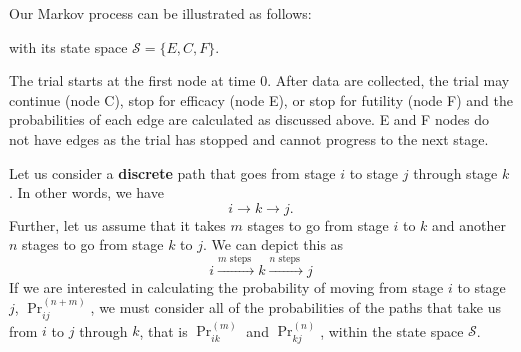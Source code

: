 \documentclass{article}
\begin{document}
Our Markov process can be illustrated as follows:
\vspace{2mm}
\begin{center}
\end{center}
%
with its state space $\mathcal{S}=\{E, C,F\}$.

The trial starts at the first node at time 0. After data are collected, the trial may continue (node C), stop for efficacy (node E), or stop for futility (node F) and the probabilities of each edge are calculated as discussed above. E and F nodes do not have edges as the trial has stopped and cannot progress to the next stage.

Let us consider a \textbf{discrete} path that goes from stage $i$ to stage $j$ through stage $k$. In other words, we have
%
\[i\to k \to  j.\]
%
Further, let us assume that it takes $m$ stages to go from stage $i$ to $k$ and another $n$ stages to go from stage $k$ to $j$. We can depict this as
%
\[
i\xrightarrow{m \text{ steps }}k\xrightarrow{n \text{ steps }}j
\]
%
If we are interested in calculating the probability of moving from stage $i$ to stage $j$, $\Pr_{ij}^{(n+m)}$, we must consider all of the probabilities of the paths that take us from $i$ to $j$ through $k$, that is $\Pr_{ik}^{(m)}$ and $\Pr_{kj}^{(n)}$, within the state space $\mathcal{S}$.
\end{document}
